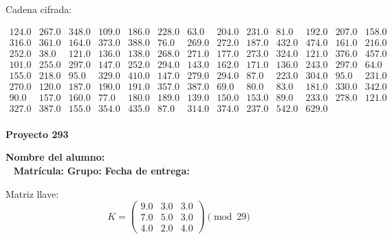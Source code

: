 \documentclass[12pt]{article}
\begin{document}
Cadena cifrada:
\begin{center}
$\begin{array}{lllllllllllll}
124.0 & 267.0 & 348.0 & 109.0 & 186.0 & 228.0 & 63.0 & 204.0 & 231.0 & 81.0 & 192.0 & 207.0 & 158.0\\
316.0 & 361.0 & 164.0 & 373.0 & 388.0 & 76.0 & 269.0 & 272.0 & 187.0 & 432.0 & 474.0 & 161.0 & 216.0\\
252.0 & 38.0 & 121.0 & 136.0 & 138.0 & 268.0 & 271.0 & 177.0 & 273.0 & 324.0 & 121.0 & 376.0 & 457.0\\
101.0 & 255.0 & 297.0 & 147.0 & 252.0 & 294.0 & 143.0 & 162.0 & 171.0 & 136.0 & 243.0 & 297.0 & 64.0\\
155.0 & 218.0 & 95.0 & 329.0 & 410.0 & 147.0 & 279.0 & 294.0 & 87.0 & 223.0 & 304.0 & 95.0 & 231.0\\
270.0 & 120.0 & 187.0 & 190.0 & 191.0 & 357.0 & 387.0 & 69.0 & 80.0 & 83.0 & 181.0 & 330.0 & 342.0\\
90.0 & 157.0 & 160.0 & 77.0 & 180.0 & 189.0 & 139.0 & 150.0 & 153.0 & 89.0 & 233.0 & 278.0 & 121.0\\
327.0 & 387.0 & 155.0 & 354.0 & 435.0 & 87.0 & 314.0 & 374.0 & 237.0 & 542.0 & 629.0\\
\end{array}$
\end{center}

\newpage


\textbf{Proyecto 293}

\textbf{Nombre del alumno:} \underline{\hspace{13cm}}\\\
\vspace{1cm}
\textbf{Matrícula:} \underline{\hspace{4cm}} \hspace{1cm}
\textbf{Grupo:} \underline{\hspace{2cm}}
\textbf{Fecha de entrega:} \underline{\hspace{2cm}}

\medskip

Matriz llave:
\[
K = \begin{pmatrix}
9.0 & 3.0 & 3.0\\
7.0 & 5.0 & 3.0\\
4.0 & 2.0 & 4.0
\end{pmatrix} \pmod{29}
\]
\end{document}
